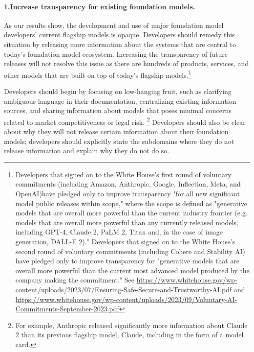 \paragraph{1.\phantom{X}Increase transparency for existing foundation models.} 
\begin{myitemize}
\item As our results show, the development and use of major foundation model developers' current flagship models is opaque. 
Developers should remedy this situation by releasing more information about the systems that are central to today's foundation model ecosystem. 
Increasing the transparency of future releases will not resolve this issue as there are hundreds of products, services, and other models that are built on top of today's flagship models.\footnote{Developers that signed on to the White House's first round of voluntary commitments (including Amazon, Anthropic, Google, Inflection, Meta, and OpenAI)have pledged only to improve transparency "for all new significant model public releases within scope," where the scope is defined as "generative models that are overall more powerful than the current industry frontier (e.g. models that are overall more powerful than any currently released models, including GPT-4, Claude 2, PaLM 2, Titan and, in the case of image generation, DALL-E 2)." Developers that signed on to the White House's second round of voluntary commitments (including Cohere and Stability AI) have pledged only to improve transparency for "generative models that are overall more powerful than the current most advanced model produced by the company making the commitment." See \url{https://www.whitehouse.gov/wp-content/uploads/2023/07/Ensuring-Safe-Secure-and-Trustworthy-AI.pdf} and \url{https://www.whitehouse.gov/wp-content/uploads/2023/09/Voluntary-AI-Commitments-September-2023.pdf}}
\item Developers should begin by focusing on low-hanging fruit, such as clarifying ambiguous language in their documentation, centralizing existing information sources, and sharing information about models that poses minimal concerns related to market competitiveness or legal risk.
\footnote{For example, Anthropic released significantly more information about Claude 2 than its previous flagship model, Claude, including in the form of a model card.} 
Developers should also be clear about why they will not release certain information about their foundation models; developers should explicitly state the subdomains where they do not release information and explain why they do not do so. 
\end{myitemize}

